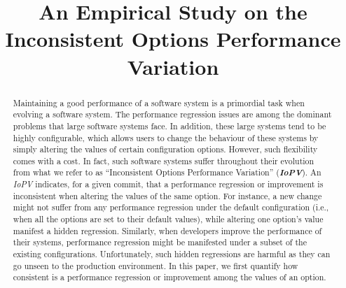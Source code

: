 \documentclass[smallextended]{svjour3}       %
\newcommand{\inconsistent}{{\em IoPV}\xspace}
\begin{document}
\title{An Empirical Study on the Inconsistent Options Performance Variation}

\newcommand{\PQI}{How common are \inconsistent issues? }
\newcommand{\PQII}{How difficult is it to manually identify \inconsistent issues?}

\newcommand{\RQI}{What is the impact of configuration on the performance regression?}
\newcommand{\RQII}{How accurately can we predict \inconsistent issues? }
\newcommand{\RQIII}{What are the most important metrics for predicting \inconsistent issues? }

\author{
}

\maketitle
\begin{abstract}
Maintaining a good performance of a software system is a primordial task when evolving a software system. The performance regression issues are among the dominant problems that large software systems face. In addition, these large systems tend to be highly configurable, which allows users to change the behaviour of these systems by simply altering the values of certain configuration options. However, such flexibility comes with a cost. In fact, such software systems suffer throughout their evolution from what we refer to as ``Inconsistent Options Performance Variation'' (\textbf{\inconsistent}). An \inconsistent indicates, for a given commit, that a performance regression or improvement is inconsistent when altering the values of the same option. For instance, a new change might not suffer from any performance regression under the default configuration (i.e., when all the options are set to their default values), while altering one option's value manifest a hidden regression. Similarly, when developers improve the performance of their systems, performance regression might be manifested under a subset of the existing configurations. Unfortunately, such hidden regressions are harmful as they can go unseen to the production environment. %
In this paper, we first quantify how consistent is a performance regression or improvement among the values of an option. %

\end{abstract}
\end{document}

